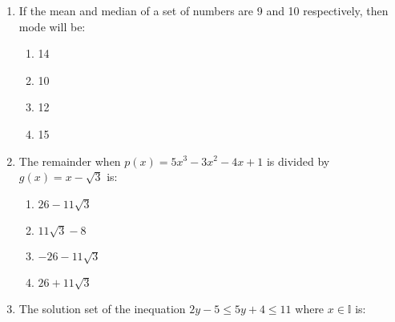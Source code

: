 \begin{enumerate}[label=(\roman*)]
        \begin{multicols}{2}
        \begin{enumerate}[label=(\alph*)]
            \item \rupee~11,400
            \item \rupee~14,400
            \item \rupee~13,680
            \item None of these.
        \end{enumerate}
        \end{multicols}

    \item If the mean and median of a set of numbers are 9 and 10 
        respectively, then mode will be:

        \begin{multicols}{2}
        \begin{enumerate}[label=(\alph*)]
            \item 14
            \item 10
            \item 12
            \item 15
        \end{enumerate}
        \end{multicols}

    \item The remainder when $p(x) = 5x^3 - 3x^2 - 4x + 1$ is divided by 
        $g(x) = x - \sqrt{3}$ is:

        \begin{multicols}{2}
        \begin{enumerate}[label=(\alph*)]
            \item $26 - 11\sqrt{3}$
            \item $11\sqrt{3} - 8$
            \item $-26 - 11\sqrt{3}$
            \item $26 + 11\sqrt{3}$
        \end{enumerate}
        \end{multicols}

    \item The solution set of the inequation $2y-5 \le 5y+4 \le 11$ where 
        $x \in \mathbb{I}$ is:


\end{enumerate}
